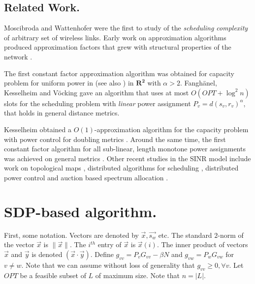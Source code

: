 \documentclass[11pt]{amsart}
\begin{document}
 


\subsection{Related Work.}

Moscibroda and Wattenhofer \cite{MoWa06} were the first to
study of the \emph{scheduling complexity} of arbitrary set
of wireless links. 
Early work on approximation algorithms
 produced approximation
factors that grew with structural properties of the network \cite{moscibroda06b,MoscibrodaOW07,chafekar07}.


The first constant factor approximation algorithm was obtained for
capacity problem for uniform power in \cite{GHWW09} (see also
\cite{HW09}) in $\mathbf{R^2}$ with $\alpha > 2$.
Fangh\"anel, Kesselheim and V\"ocking \cite{FKV09} gave an algorithm
that uses at most $O(OPT + \log^2 n)$ slots for the scheduling problem
with \emph{linear} power assignment $P_v = d(s_v, r_v)^\alpha$,
that holds in general distance metrics.


Kesselheim obtained 
a $O(1)$-approximation algorithm
for the capacity problem with power control for doubling metrics \cite{KesselheimSoda11}. Around the same time,
the first constant factor algorithm for all sub-linear, length monotone power assignments
was achieved on general metrics \cite{SODA11}. Other recent studies in the SINR model
include work on topological maps \cite{stoc_topology11}, distributed algorithms for scheduling \cite{icalp11},
distributed power control \cite{damsicalp11} and auction based spectrum allocation \cite{hoeferspaa11}.







\section{SDP-based algorithm.}

First, some notation. Vectors are denoted by $\vec{x}, \vec{s_w}$ etc. The standard $2$-norm of the vector $\vec{x}$ is $\|\vec{x}\|$. The $i^{th}$
entry of $\vec{x}$ is $\vec{x}(i)$.
The inner product of vectors $\vec{x}$ and $\vec{y}$ is denoted $(\vec{x} \cdot \vec{y})$. Define $g_{vv} = P_v G_{vv} - \beta N$ and $g_{vw} = P_w G_{vw}$ for $v \neq w$. 
Note that we can assume without loss of generality that $g_{vv} \geq 0, \forall v$.
Let $OPT$ be a feasible subset of $L$
of maximum size. Note that $n = |L|$.
\end{document}
